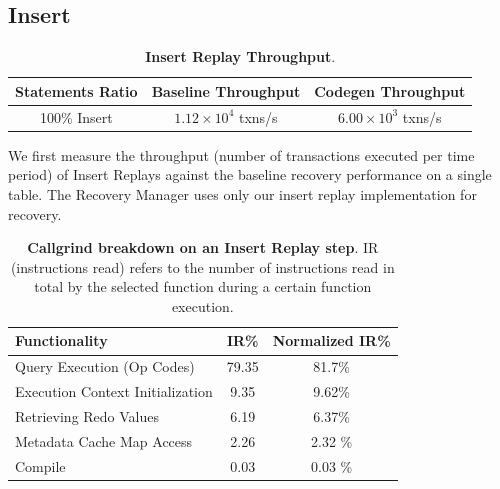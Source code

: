 \documentclass[12pt]{cmuthesis}
\begin{document}
\subsection{Insert}
\label{insert_test}

\begin{table}[H]
\begin{center}
\begin{tabular}{ c c c } 
 \toprule
\textbf{Statements Ratio} & \textbf{Baseline Throughput} & \textbf{Codegen Throughput}\\ 
 \toprule
 100\% Insert & $1.12 \times 10^4$ txns/s & $6.00 \times 10^3$ txns/s\\
 \bottomrule
\end{tabular}
\caption{\textbf{Insert Replay Throughput}.}
\label{tab:throughput_exp_insert}
\end{center}
\end{table}
We first measure the throughput (number of transactions executed per time period) of Insert Replays against the baseline recovery performance on a single table. The Recovery Manager uses only our insert replay implementation for recovery.

\begin{table}[H]
\begin{center}
\begin{tabular}{ l c c } 
 \toprule
\textbf{Functionality} & \textbf{IR\%} & \textbf{Normalized IR\%} \\ 
 \toprule
Query Execution (Op Codes) & 79.35 & 81.7\% \\
 \midrule
 Execution Context Initialization & 9.35 & 9.62\%  \\ 
 \midrule
 Retrieving Redo Values & 6.19 & 6.37\%  \\
 \midrule
 Metadata Cache Map Access & 2.26 & 2.32 \%  \\
 \midrule
 Compile & 0.03 & 0.03 \% \\
 \bottomrule
\end{tabular}

\caption{\textbf{Callgrind breakdown on an Insert Replay step}. IR (instructions read) refers to the number of instructions read in total by the selected function during a certain function execution.}
\label{tab:throughput_exp_insert_overhead_all}
\end{center}
\end{table}
\end{document}
